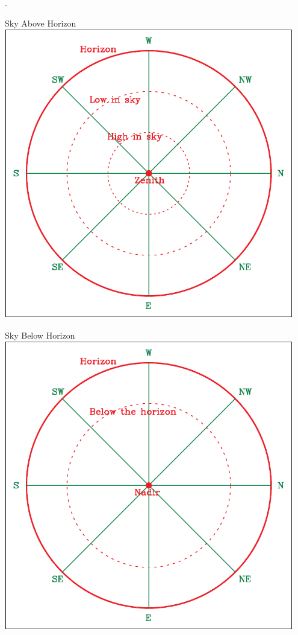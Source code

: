 \documentclass[12pt]{article}
\begin{document}
	


\bigskip
\newpage

.
\vspace{0.7in}


\begin{minipage}{0.5\textwidth}
	\begin{center}
		\large Sky Above Horizon\\
		\includegraphics[width=0.95\textwidth]{topsky-crop.pdf}
	\end{center}
\end{minipage}
\begin{minipage}{0.5\textwidth}
	\begin{center}
		\large Sky Below Horizon\\
		\includegraphics[width=0.95\textwidth]{botsky-crop.pdf}
	\end{center}
\end{minipage}




\bigskip
\end{document}
